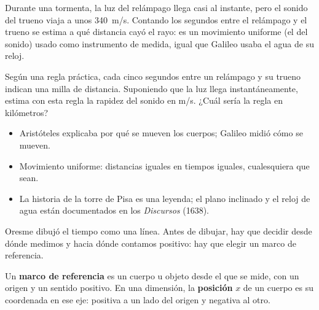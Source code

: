 \documentclass[11pt]{article}
\begin{document}
\begin{aplicacion}
Durante una tormenta, la luz del relámpago llega casi al instante, pero el sonido del trueno
viaja a unos \qty{340}{m/s}. Contando los segundos entre el relámpago y el trueno se estima a
qué distancia cayó el rayo: es un movimiento uniforme (el del sonido) usado como instrumento de
medida, igual que Galileo usaba el agua de su reloj.
\end{aplicacion}

\begin{preguntas}
\pregunta Según una regla práctica, cada cinco segundos entre un relámpago y su trueno indican
una milla de distancia. Suponiendo que la luz llega instantáneamente, estima con esta regla la
rapidez del sonido en m/s. ¿Cuál sería la regla en kilómetros?
\espacio{3cm}
\end{preguntas}

\begin{resumen}
\begin{itemize}
  \item Aristóteles explicaba por qué se mueven los cuerpos; Galileo midió cómo se mueven.
  \item Movimiento uniforme: distancias iguales en tiempos iguales, cualesquiera que sean.
  \item La historia de la torre de Pisa es una leyenda; el plano inclinado y el reloj de agua
        están documentados en los \emph{Discursos} (1638).
\end{itemize}
\end{resumen}

\label{tema:describir}

\begin{hilo}
Oresme dibujó el tiempo como una línea. Antes de dibujar, hay que decidir desde dónde medimos
y hacia dónde contamos positivo: hay que elegir un marco de referencia.
\end{hilo}

\begin{definicion}
Un \textbf{marco de referencia} es un cuerpo u objeto desde el que se mide, con un origen y un
sentido positivo. En una dimensión, la \textbf{posición} $x$ de un cuerpo es su coordenada en
ese eje: positiva a un lado del origen y negativa al otro.
\end{definicion}
\end{document}

